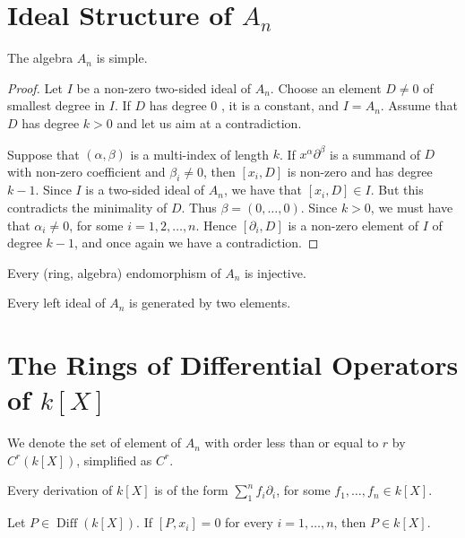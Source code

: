 \documentclass[12pt, oneside]{book}
\begin{document}
\section{Ideal Structure of $A_n$} %

\begin{theorem}
    The algebra $A_n$ is simple.
    \begin{proof}
        Let $I$ be a non-zero two-sided ideal of $A_n$. Choose an element $D \neq 0$ of smallest degree in $I$. If $D$ has degree 0 , it is a constant, and $I=A_n$. Assume that $D$ has degree $k>0$ and let us aim at a contradiction.

        Suppose that $(\alpha, \beta)$ is a multi-index of length $k$. If $x^\alpha \partial^\beta$ is a summand of $D$ with non-zero coefficient and $\beta_i \neq 0$, then $\left[x_i, D\right]$ is non-zero and has degree $k-1$.
        Since $I$ is a two-sided ideal of $A_n$, we have that $\left[x_i, D\right] \in I$. But this contradicts the minimality of $D$. Thus $\beta=(0, \ldots, 0)$. Since $k>0$, we must have that $\alpha_i \neq 0$, for some $i=1,2, \ldots, n$. Hence $\left[\partial_i, D\right]$ is a non-zero element of $I$ of degree $k-1$, and once again we have a contradiction.
    \end{proof}
\end{theorem}

\begin{corollary}
    Every (ring, algebra) endomorphism of $A_n$ is injective.
\end{corollary}

\begin{theorem}
    Every left ideal of $A_n$ is generated by two elements.
\end{theorem}
\section{The Rings of Differential Operators of $k[X]$} %
We denote the set of element of $A_n$ with order less than or equal to $r$ by $C^r(k[X])$, simplified as $C^r$.
\begin{proposition}
    Every derivation of $k[X]$ is of the form $\sum_1^n f_i \partial_i$, for some $f_1, \ldots, f_n \in k[X]$.
\end{proposition}

\begin{lemma}
    Let $P \in \operatorname{Diff}(k[X])$. If $\left[P, x_i\right]=0$ for every $i=1, \ldots, n$, then $P \in k[X]$.
\end{lemma}
\end{document}
